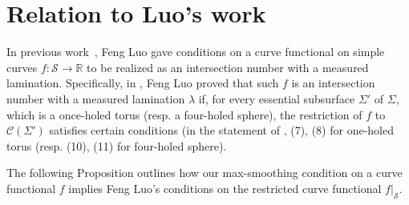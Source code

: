 \section{Relation to Luo's work}
\label{sec:luo}

In previous work~\cite{Lu10}, Feng Luo gave conditions on a curve functional on simple curves $f \colon \mathcal{S} \to \mathbb{R}$ to be realized as an intersection number with a measured lamination.
Specifically, in \cite[Theorem~5.1]{Lu10}, Feng Luo proved that such
$f$ is an intersection number with a measured lamination $\lambda$ if, for every essential subsurface $\Sigma'$ of $\Sigma$, which is a once-holed torus (resp. a four-holed sphere), the restriction of $f$ to $\mathcal{C}(\Sigma')$ satisfies certain conditions (in the statement of \cite[Theorem~5.1]{Lu10}, (7), (8) for one-holed torus (resp. (10), (11) for four-holed sphere).

The following Proposition outlines how our max-smoothing condition on a curve functional $f$ implies Feng Luo's conditions on the restricted curve functional $f|_{\mathcal{S}}$.


